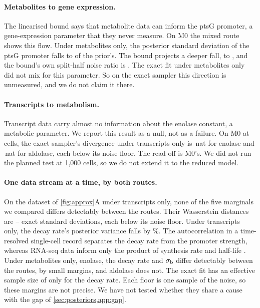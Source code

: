 \paragraph{Metabolites to gene expression.} The linearised bound says that metabolite
data can inform the ptsG promoter, a gene-expression parameter that they never measure.
On M0 the mixed route shows this flow. Under metabolites only, the posterior standard
deviation of the ptsG promoter falls to  of the prior's. The bound
projects a deeper fall, to , and the bound's own
split-half noise ratio is . The exact fit under metabolites only
did not mix for this parameter. So on the exact sampler this direction is unmeasured,
and we do not claim it there.

\paragraph{Transcripts to metabolism.} Transcript data carry almost no information
about the enolase constant, a metabolic parameter. We report this result as a null, not
as a failure. On M0 at  cells, the exact sampler's divergence under
transcripts only is \,nat for enolase and \,nat for
aldolase, each below its noise floor. The read-off is M0's. We did not run the planned
test at 1,000 cells, so we do not extend it to the reduced model.

\paragraph{One data stream at a time, by both routes.} On the dataset of
\cref{fig:approx}A under transcripts only, none of the five marginals we compared differs detectably between the
routes. Their Wasserstein distances are -- exact standard
deviations, each below its noise floor. Under transcripts only, the decay rate's
posterior variance falls by \%. The autocorrelation in a
time-resolved single-cell record separates the decay rate from the promoter strength,
whereas RNA-seq data inform only the product of synthesis rate and half-life
\cite{karr2015summary}. Under metabolites only, enolase, the decay rate and $\sigma_{\mathrm{b}}$
differ detectably between the routes, by small margins, and aldolase does not. The exact
fit has an effective sample size of only  for the decay rate. Each
floor is one sample of the noise, so these margins are not precise. We have not tested
whether they share a cause with the gap of \cref{sec:posteriors,app:gap}.
